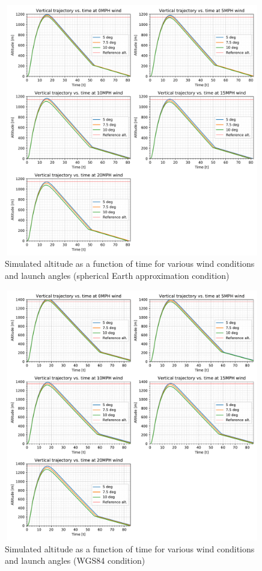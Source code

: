 \begin{figure}[h]
    \centering
    \includegraphics[width = 15cm, height = 11cm]{img/FIDO/VerticalTrajectory-1.png}
    \caption{Simulated altitude as a function of time for various wind conditions and launch angles (spherical Earth approximation condition)}
    \label{fig:my_label}
\end{figure}
\begin{figure}[h]
    \centering
    \includegraphics[width = 15cm, height = 11cm]{img/FIDO/VerticalTrajectoryWGS.pdf}
    \caption{Simulated altitude as a function of time for various wind conditions and launch angles (WGS84 condition)}
    \label{fig:my_label}
\end{figure}
